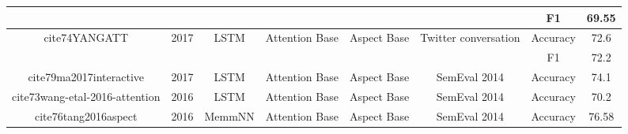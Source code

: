 \documentclass[12pt, a4paper, oneside]{report}
\begin{document}
\begin{tabular}{|c|c|c|c|c|c|cc|}
                                                                          &                       &                                   &                                         &                                                                                                        &                                       & \multicolumn{1}{c|}{F1}                                                                                                            & 69.55  \\ \hline
    \multirow{2}{*}{cite{74YANGATT}}                    & \multirow{2}{*}{2017} & \multirow{2}{*}{LSTM}             & \multirow{2}{*}{Attention Base}         & \multirow{2}{*}{Aspect Base}                                                                           & \multirow{2}{*}{Twitter conversation} & \multicolumn{1}{c|}{Accuracy}                                                                                                      & 72.6   \\ \cline{7-8} 
                                                                          &                       &                                   &                                         &                                                                                                        &                                       & \multicolumn{1}{c|}{F1}                                                                                                            & 72.2   \\ \hline
    cite{79ma2017interactive}                           & 2017                  & LSTM                              & Attention Base                          & Aspect Base                                                                                            & SemEval 2014                          & \multicolumn{1}{c|}{Accuracy}                                                                                                      & 74.1   \\ \hline
    cite{73wang-etal-2016-attention}                    & 2016                  & LSTM                              & Attention Base                          & Aspect Base                                                                                            & SemEval 2014                          & \multicolumn{1}{c|}{Accuracy}                                                                                                      & 70.2   \\ \hline
    cite{76tang2016aspect}                              & 2016                  & MemmNN                            & Attention Base                          & Aspect Base                                                                                            & SemEval 2014                          & \multicolumn{1}{c|}{Accuracy}                                                                                                      & 76.58  \\ \hline

\end{tabular}
\end{document}
